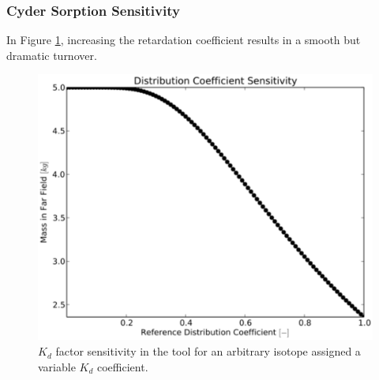 
\begin{frame}[ctb!]
\frametitle{Cyder Sorption Sensitivity}

In Figure \ref{fig:kd_result}, increasing the retardation 
coefficient results in a smooth but dramatic turnover. 

\begin{figure}[ht]
\centering
\includegraphics[width=0.7\linewidth]{./nuclide_demonstration/kd.eps}
\caption{$K_d$ factor sensitivity in the \Cyder tool for an arbitrary isotope 
assigned a variable $K_d$ coefficient.} 
\label{fig:kd_result}
\end{figure}
\end{frame}
